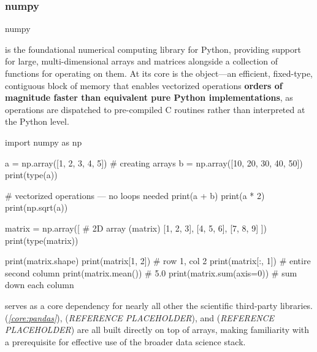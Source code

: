 \documentclass[10pt]{article}
\begin{document}
    \subsubsection{numpy}

      \begin{core}[label=core:numpy]{numpy}

        \href{https://numpy.org/doc/stable/reference/}{} is the foundational numerical computing library for Python, providing support for large, multi-dimensional arrays and matrices alongside a collection of functions for operating on them. At its core is the  object---an efficient, fixed-type, contiguous block of memory that enables vectorized operations \textbf{orders of magnitude faster than equivalent pure Python implementations}, as operations are dispatched to pre-compiled C routines rather than interpreted at the Python level.

        \begin{pyconsole}

          import numpy as np

          a = np.array([1, 2, 3, 4, 5]) # creating arrays
          b = np.array([10, 20, 30, 40, 50])
          print(type(a))

          # vectorized operations — no loops needed
          print(a + b)
          print(a * 2)
          print(np.sqrt(a))

          matrix = np.array([ # 2D array (matrix)
              [1, 2, 3],
              [4, 5, 6],
              [7, 8, 9]
          ])
          print(type(matrix))

          print(matrix.shape)
          print(matrix[1, 2]) # row 1, col 2
          print(matrix[:, 1]) # entire second column
          print(matrix.mean()) # 5.0
          print(matrix.sum(axis=0)) # sum down each column

        \end{pyconsole}

         serves as a core dependency for nearly all other the scientific third-party libraries.  (\textit{\autoref{core:pandas}}),  (\textit{REFERENCE PLACEHOLDER}), and  (\textit{REFERENCE PLACEHOLDER}) are all built directly on top of  arrays, making familiarity with  a prerequisite for effective use of the broader data science stack.

      \end{core}
\end{document}
